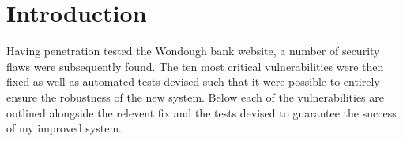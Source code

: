 \tableofcontents
\section{Introduction}

Having penetration tested the Wondough bank website, a number of security flaws were subsequently found. The ten most critical vulnerabilities were then fixed as
well as automated tests devised such that it were possible to entirely ensure the robustness of the new system. Below each of the vulnerabilities are outlined alongside
the relevent fix and the tests devised to guarantee the success of my improved system.